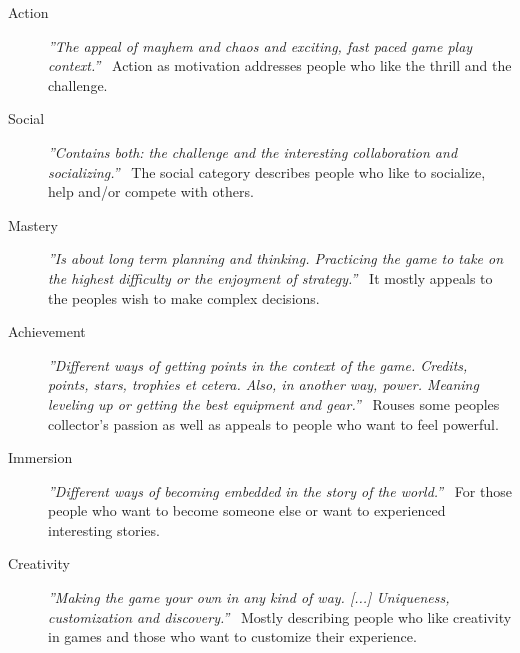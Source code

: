 
\begin{description}%
	\item[Action] \textit{''The appeal of mayhem and chaos and exciting, fast paced game play context.''}~\cite{online:motivation} \newline Action as motivation addresses people who like the thrill and the challenge.
	
	\item[Social] \textit{''Contains both: the challenge and the interesting collaboration and socializing.''}~\cite{online:motivation} \newline The social category describes people who like to socialize, help and/or compete with others.
	
	\item[Mastery] \textit{''Is about long term planning and thinking. Practicing the game to take on the highest difficulty or the enjoyment of strategy.''}~\cite{online:motivation} \newline It mostly appeals to the peoples wish to make complex decisions.
	
	\item[Achievement] \textit{''Different ways of getting points in the context of the game. Credits, points, stars, trophies et cetera. Also, in another way, power. Meaning leveling up or getting the best equipment and gear.''}~\cite{online:motivation} \newline Rouses some peoples collector's passion as well as appeals to people who want to feel powerful.
	
	\item[Immersion] \textit{''Different ways of becoming embedded in the story of the world.''}~\cite{online:motivation} \newline For those people who want to become someone else or want to experienced interesting stories.
	
	\item[Creativity] \textit{''Making the game your own in any kind of way. [...] Uniqueness, customization and discovery.''}~\cite{online:motivation} \newline Mostly describing people who like creativity in games and those who want to customize their experience.

\end{description}

